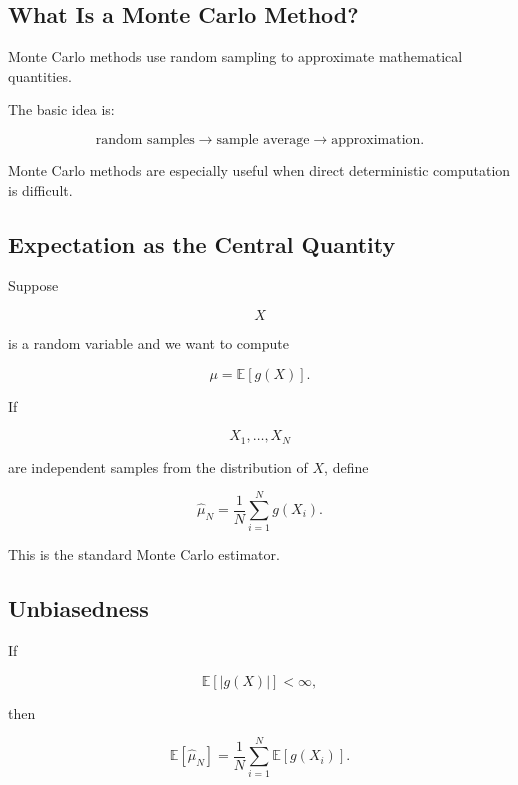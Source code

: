 \subsection{What Is a Monte Carlo Method?}
\label{subsec:what-is-monte-carlo}

Monte Carlo methods use random sampling to approximate mathematical
quantities.

The basic idea is:

\[
\boxed{
\text{random samples}
\longrightarrow
\text{sample average}
\longrightarrow
\text{approximation}.
}
\]

Monte Carlo methods are especially useful when direct deterministic
computation is difficult.

\subsection{Expectation as the Central Quantity}
\label{subsec:monte-carlo-expectation}

Suppose

\[
X
\]

is a random variable and we want to compute

\[
\boxed{
\mu
=
\mathbb{E}[g(X)].
}
\]

If

\[
X_1,\ldots,X_N
\]

are independent samples from the distribution of \(X\), define

\[
\boxed{
\widehat{\mu}_N
=
\frac1N
\sum_{i=1}^{N}
g(X_i).
}
\]

This is the standard Monte Carlo estimator.

\subsection{Unbiasedness}
\label{subsec:monte-carlo-unbiasedness}

If

\[
\mathbb{E}[|g(X)|]<\infty,
\]

then

\[
\mathbb{E}
[
\widehat{\mu}_N
]
=
\frac1N
\sum_{i=1}^{N}
\mathbb{E}[g(X_i)].
\]

